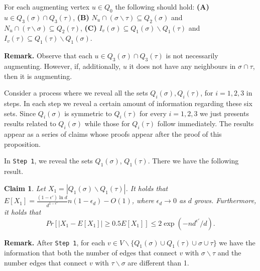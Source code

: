 \documentclass[a4paper,10pt]{article}
\newtheorem{claim}{Claim}\renewcommand{\theclaim}{\arabic{claim}}
\begin{document}
For each augmenting vertex  $u\in Q_0$ the following should hold:
{\bf (A)} $u\in Q_3(\sigma)\cap Q_3(\tau)$, 
{\bf (B)} $N_u\cap (\sigma\backslash \tau)\subseteq Q_2(\sigma)$ and
$N_u\cap (\tau\backslash \sigma)\subseteq Q_2(\tau)$,
{\bf (C)} $I_v(\sigma)\subseteq Q_1(\sigma)\backslash Q_1(\tau)$  and  $I_v(\tau)\subseteq 
Q_1(\tau)\backslash Q_1(\sigma)$.
\\ \vspace{-.1cm}


\noindent
{\bf Remark.}
Observe that each $u\in Q_3(\sigma)\cap Q_3(\tau)$ is not necessarily
augmenting. However, if, additionally, $u$ it does not have any neighbours 
in  $\sigma \cap \tau$, then it is augmenting.
\\ \vspace{-.2cm}


\noindent
Consider a process where we reveal all the sets $Q_i(\sigma),Q_i(\tau)$,
for $i=1,2,3$ in steps. In each step we reveal a certain amount of
information regarding these six sets. Since $Q_i(\sigma)$ is symmetric 
to $Q_i(\tau)$ for every $i=1,2,3$ we just presents results related to 
$Q_i(\sigma)$ while those for $Q_i(\tau)$ follow immediately. The results 
appear as a series of claims whose proofs appear after the proof of this 
proposition.



In  {\tt Step 1}, we reveal the sets $Q_1(\sigma)$, $Q_1(\tau)$.  
There we have  the following result.


\begin{claim}\label{claim:Q1Claim}
Let $X_1=|Q_1(\sigma)\backslash Q_1(\tau)|$.  It holds that 
$E[X_1]=\frac{(1-\epsilon')\ln d}{d^{1-\epsilon'}}n(1-\epsilon_d)-O(1)$,
where $\epsilon_d\to 0$ as $d$ grows. Furthermore, it holds that 
\begin{displaymath}
Pr \left[\left|X_1-E[X_1]\right|\geq 0.5 E[X_1] \right]\leq 2\exp
\left(-n{d^{\epsilon'}}/{d} \right).
\end{displaymath}
\end{claim}


\noindent
{\bf Remark.}
After {\tt Step 1}, for each $v\in V\backslash  \{Q_1(\sigma)\cup 
Q_1(\tau)\cup\sigma\cup \tau\}$ we have the information that both
the number of edges that connect $v$ with $\sigma\backslash \tau$ 
and the number edges that connect $v$ with $\tau\backslash \sigma$
are different than 1. 
\\ \vspace{-.3cm}
\end{document}
